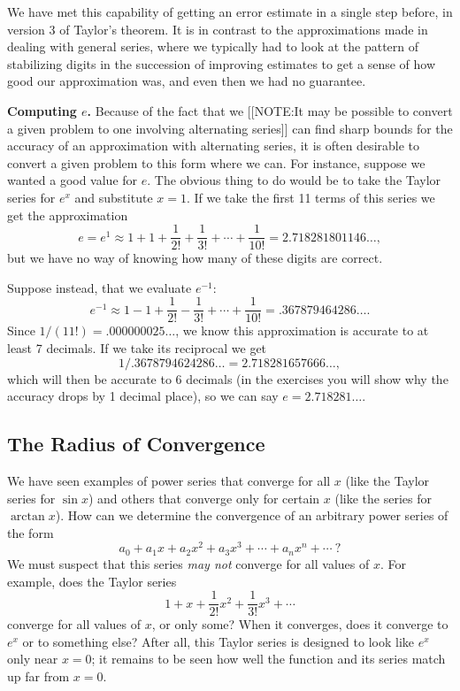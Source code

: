 We have met this capability of getting an error estimate in a single
step before, in version 3 of Taylor's theorem.  It is in contrast to the
approximations made in dealing with general series, where we typically
had to look at the pattern of stabilizing digits in the succession of
improving estimates to get a sense of how good our approximation was,
and even then we had no guarantee.





{\bf Computing $e$.}  Because of the fact that we
[[NOTE:It may be possible  to convert  a given problem  to one involving 
  alternating series]]
can find sharp bounds for the accuracy of an approximation with
alternating series, it is often desirable to convert a given problem
to this form where we can.  For instance, suppose we wanted a good
value for $e$.  The obvious thing to do would be to take the Taylor
series for $e^x$ and substitute $x=1$.  If we take the first 11 terms
of this series we get the approximation
\[
e = e^1 \approx 1 + 1 + \dfrac{1}{2!} + \dfrac{1}{3!} + \cdots 
     + \dfrac{1}{10!} = 2.718281801146\ldots ,
\]
but we have no way of knowing how many of these digits are correct.

Suppose instead, that we evaluate $e^{-1}$:
\[
e^{-1} \approx 1 - 1 + \dfrac{1}{2!} - \dfrac{1}{3!} + \cdots 
     + \dfrac{1}{10!} = .367879464286\ldots .
\]
Since $1/(11!) = .000000025\ldots$, we know this approximation is
accurate to at least 7 decimals.  If we take its reciprocal we get
\[
1/.3678794624286\ldots = 2.718281657666\ldots ,
\]
which will then be accurate to 6 decimals (in the exercises you will
show why the accuracy drops by 1 decimal place), so we can say
$e=2.718281\ldots .$




\subsection{The Radius of Convergence}
\label{subsec:the-radius-of-convergence}

We have seen examples of power series that converge for all $x$ (like
the Taylor series for $\sin{x}$) and others that converge only for
certain $x$ (like the series for $\arctan{x}$).  How can we determine
the convergence of an arbitrary power series of the form
        \[
a_0 + a_1 x + a_2 x^2 + a_3 x^3  + \cdots 
                + a_n x^n + \cdots \ ?
\]
We must suspect that this series {\em may not\/} converge for all
values of $x$.  For example, does the Taylor series
        \[
1 + x + \dfrac{1}{2!} x^2 + \dfrac{1}{3!} x^3 + \cdots
\]
converge for all values of $x$, or only some?  When it converges, does
it converge to $e^x$ or to something else?  After all, this Taylor
series is designed to look like $e^x$ only near $x = 0$; it remains to
be seen how well the function and its series match up far from $x =
0$.

